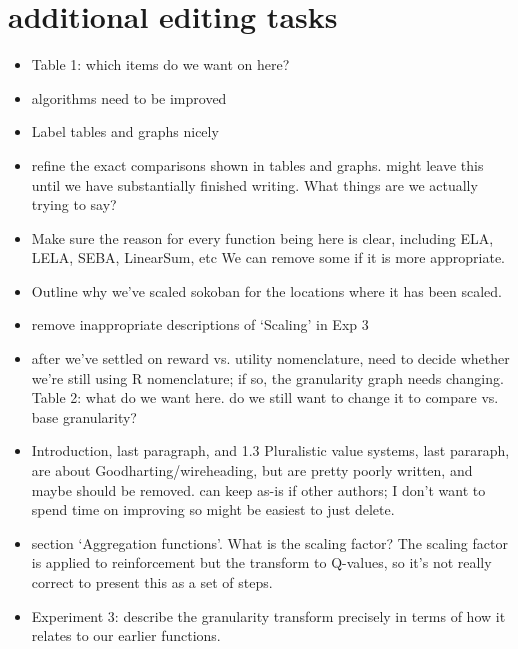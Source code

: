 \section*{additional editing tasks}
\begin{itemize}
    \item Table 1: which items do we want on here?
    \item algorithms need to be improved
    \item Label tables and graphs nicely
    \item refine the exact comparisons shown in tables and graphs. might leave this until we have substantially finished writing. What things are we actually trying to say?
    \item Make sure the reason for every function being here is clear, including ELA, LELA, SEBA, LinearSum, etc We can remove some if it is more appropriate.
    \item Outline why we've scaled sokoban for the locations where it has been scaled.
    \item remove inappropriate descriptions of `Scaling' in Exp 3
    \item after we've settled on reward vs. utility nomenclature, need to decide whether we're still using R nomenclature; if so, the granularity graph needs changing.
    \time Table 2: what do we want here. do we still want to change it to compare vs. base granularity?
    \item Introduction, last paragraph, and 1.3 Pluralistic value systems, last pararaph, are about Goodharting/wireheading, but are pretty poorly written, and maybe should be removed. can keep as-is if other authors; I don't want to spend time on improving so might be easiest to just delete.
    \item section `Aggregation functions'. What is the scaling factor? The scaling factor is applied to reinforcement but the transform to Q-values, so it's not really correct to present this as a set of steps.
    \item Experiment 3: describe the granularity transform precisely in terms of how it relates to our earlier functions.
\end{itemize}
 